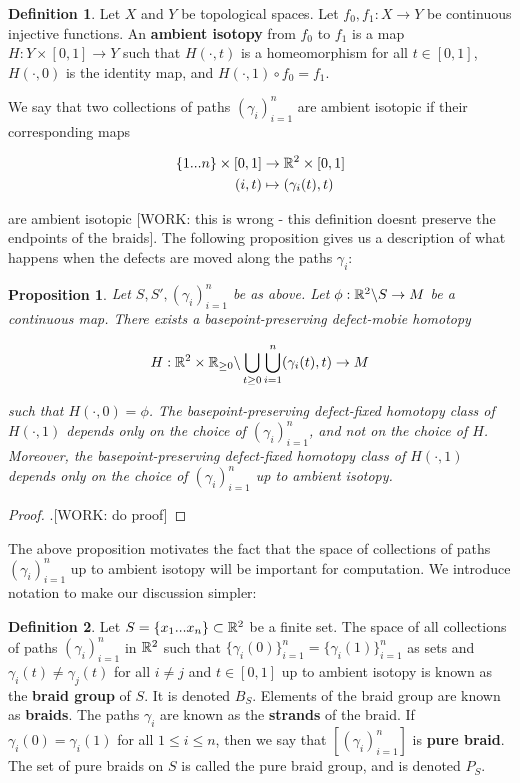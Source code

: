 \documentclass{article}
\newtheorem{proposition}{Proposition}[section]
\theoremstyle{definition}
\newtheorem*{definition}{Definition}
\numberwithin{figure}{section}
\begin{document}
\begin{definition} Let $X$ and $Y$ be topological spaces. Let $f_0,f_1: X\to Y$ be continuous injective functions. An \textbf{ambient isotopy} from $f_0$ to $f_1$ is a map $H: Y\times [0,1]\to Y$ such that $H(\cdot,t)$ is a homeomorphism for all $t\in [0,1]$, $H(\cdot,0)$ is the identity map, and $H(\cdot,1)\circ f_0=f_1$.
\end{definition}

We say that two collections of paths $(\gamma_i)_{i=1}^n$ are ambient isotopic if their corresponding maps

\begin{align*}
\{1...n\}\times [0,1]&\to \mathbb{R}^2 \times [0,1]\\
(i,t)&\mapsto (\gamma_i(t),t)
\end{align*}

are ambient isotopic [WORK: this is wrong - this definition doesnt preserve the endpoints of the braids]. The following proposition gives us a description of what happens when the defects are moved along the paths $\gamma_i$:

\begin{proposition} Let $S,S',(\gamma_i)_{i=1}^n$ be as above. Let $\phi:\mathbb{R}^2\backslash S \to M$ be a continuous map. There exists a basepoint-preserving defect-mobie homotopy

$$H:\mathbb{R}^2\times \mathbb{R}_{\geq 0} \backslash \bigcup_{t\geq 0}\bigcup_{i=1}^{n}(\gamma_i(t),t)\to M$$

such that $H(\cdot,0)=\phi$. The basepoint-preserving defect-fixed homotopy class of $H(\cdot,1)$ depends only on the choice of $(\gamma_i)_{i=1}^n$, and not on the choice of $H$. Moreover, the basepoint-preserving defect-fixed homotopy class of $H(\cdot,1)$ depends only on the choice of $(\gamma_i)_{i=1}^n$ up to ambient isotopy.

\end{proposition}
\begin{proof}.[WORK: do proof]
\end{proof}

The above proposition motivates the fact that the space of collections of paths $(\gamma_i)_{i=1}^n$ up to ambient isotopy will be important for computation. We introduce notation to make our discussion simpler:

\begin{definition} Let $S=\{x_1...x_n\} \subset \mathbb{R}^2$ be a finite set. The space of all collections of paths $(\gamma_i)_{i=1}^n$ in $\mathbb{R}^2$ such that $\{\gamma_i(0)\}_{i=1}^n=\{\gamma_i(1)\}_{i=1}^n$ as sets and $\gamma_i(t)\neq \gamma_j(t)$ for all $i\neq j$ and $t\in [0,1]$ up to ambient isotopy is known as the \textbf{braid group} of $S$. It is denoted $B_S$. Elements of the braid group are known as \textbf{braids}. The paths $\gamma_i$ are known as the \textbf{strands} of the braid. If $\gamma_i(0)=\gamma_i(1)$ for all $1\leq i\leq n$, then we say that $\left[(\gamma_i)_{i=1}^n\right]$ is \textbf{pure braid}. The set of pure braids on $S$ is called the pure braid group, and is denoted $P_S$.
\end{definition}
\end{document}
